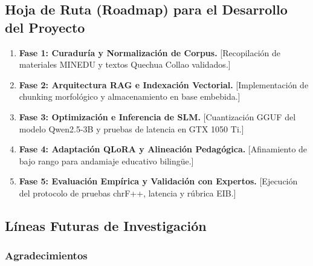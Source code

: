\subsection{Hoja de Ruta (Roadmap) para el Desarrollo del Proyecto}
\begin{enumerate}[1.]
	\item \textbf{Fase 1: Curaduría y Normalización de Corpus.} [Recopilación de materiales MINEDU y textos Quechua Collao validados.]
	\item \textbf{Fase 2: Arquitectura RAG e Indexación Vectorial.} [Implementación de chunking morfológico y almacenamiento en base embebida.]
	\item \textbf{Fase 3: Optimización e Inferencia de SLM.} [Cuantización GGUF del modelo Qwen2.5-3B y pruebas de latencia en GTX 1050 Ti.]
	\item \textbf{Fase 4: Adaptación QLoRA y Alineación Pedagógica.} [Afinamiento de bajo rango para andamiaje educativo bilingüe.]
	\item \textbf{Fase 5: Evaluación Empírica y Validación con Expertos.} [Ejecución del protocolo de pruebas chrF++, latencia y rúbrica EIB.]
\end{enumerate}

\subsection{Líneas Futuras de Investigación}

\subsubsection*{Agradecimientos}
